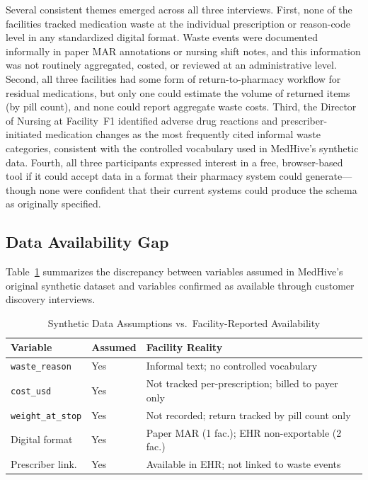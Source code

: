 \documentclass[letterpaper, 10pt, conference]{IEEEconf}
\begin{document}
Several consistent themes emerged across all three interviews.
First, none of the facilities tracked medication waste at the individual
prescription or reason-code level in any standardized digital format.
Waste events were documented informally in paper MAR annotations or nursing
shift notes, and this information was not routinely aggregated, costed, or
reviewed at an administrative level.
Second, all three facilities had some form of return-to-pharmacy workflow for
residual medications, but only one could estimate the volume of returned
items (by pill count), and none could report aggregate waste costs.
Third, the Director of Nursing at Facility~F1 identified adverse drug
reactions and prescriber-initiated medication changes as the most frequently
cited informal waste categories, consistent with the controlled vocabulary
used in MedHive's synthetic data.
Fourth, all three participants expressed interest in a free, browser-based
tool if it could accept data in a format their pharmacy system could generate---
though none were confident that their current systems could produce the schema
as originally specified.

\subsection{Data Availability Gap}

Table~\ref{table:gap} summarizes the discrepancy between variables assumed in
MedHive's original synthetic dataset and variables confirmed as available
through customer discovery interviews.

\begin{table}[h]
\caption{Synthetic Data Assumptions vs.\ Facility-Reported Availability}
\label{table:gap}
\begin{center}
\footnotesize
\begin{tabularx}{\columnwidth}{|p{2.6cm}|p{1.2cm}|X|}
\hline
\textbf{Variable} & \textbf{Assumed} & \textbf{Facility Reality} \\
\hline
\texttt{waste\_reason} & Yes & Informal text; no controlled vocabulary \\
\hline
\texttt{cost\_usd} & Yes & Not tracked per-prescription; billed to payer only \\
\hline
\texttt{weight\_at\_stop} & Yes & Not recorded; return tracked by pill count only \\
\hline
Digital format & Yes & Paper MAR (1 fac.); EHR non-exportable (2 fac.) \\
\hline
Prescriber link. & Yes & Available in EHR; not linked to waste events \\
\hline
\end{tabularx}
\end{center}
\end{table}
\end{document}
